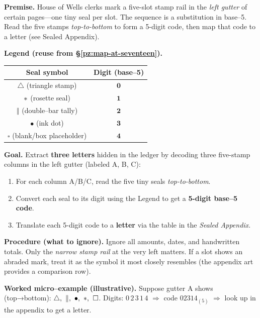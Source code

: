 \documentclass[11pt]{article}
\numberwithin{equation}{section} %
\theoremstyle{plain} %
\theoremstyle{definition} %
\theoremstyle{remark} %
\begin{document}
\medskip
\noindent\textbf{Premise.} House of Wells clerks mark a five-slot stamp rail in the \emph{left gutter} of certain pages—one tiny seal per slot. The sequence is a substitution in base–5. Read the five stamps \emph{top-to-bottom} to form a 5-digit code, then map that code to a letter (see Sealed Appendix).

\medskip
\noindent\textbf{Legend (reuse from \S\ref{pz:map-at-seventeen}).}
\begin{center}
\begin{tabular}{c|c}
\textbf{Seal symbol} & \textbf{Digit (base–5)} \\
\hline
\(\triangle\) (triangle stamp) & \(\mathbf{0}\) \\
\(\large\ast\) (rosette seal) & \(\mathbf{1}\) \\
\(\Vert\) (double–bar tally) & \(\mathbf{2}\) \\
\(\bullet\) (ink dot) & \(\mathbf{3}\) \\
\(\square\) (blank/box placeholder) & \(\mathbf{4}\) \\
\end{tabular}
\end{center}

\medskip
\noindent\textbf{Goal.} Extract \textbf{three letters} hidden in the ledger by decoding three five-stamp columns in the left gutter (labeled \textsc{A}, \textsc{B}, \textsc{C}):

\begin{enumerate}\setlength\itemsep{0.25em}
  \item For each column \textsc{A}/\textsc{B}/\textsc{C}, read the five tiny seals \emph{top-to-bottom}.
  \item Convert each seal to its digit using the Legend to get a \textbf{5-digit base–5 code}.
  \item Translate each 5-digit code to a \textbf{letter} via the table in the \emph{Sealed Appendix}.
\end{enumerate}

\medskip
\noindent\textbf{Procedure (what to ignore).} Ignore all amounts, dates, and handwritten totals. Only the \emph{narrow stamp rail} at the very left matters. If a slot shows an abraded mark, treat it as the symbol it most closely resembles (the appendix art provides a comparison row).

\medskip
\noindent\textbf{Worked micro–example (illustrative).}  
Suppose gutter \textsc{A} shows (top→bottom): \(\triangle,\ \Vert,\ \bullet,\ \large\ast,\ \square\).  
Digits: \(0\,2\,3\,1\,4\) \(\Rightarrow\) code \(02314_{(5)}\) \(\Rightarrow\) look up in the appendix to get a letter.
\end{document}

